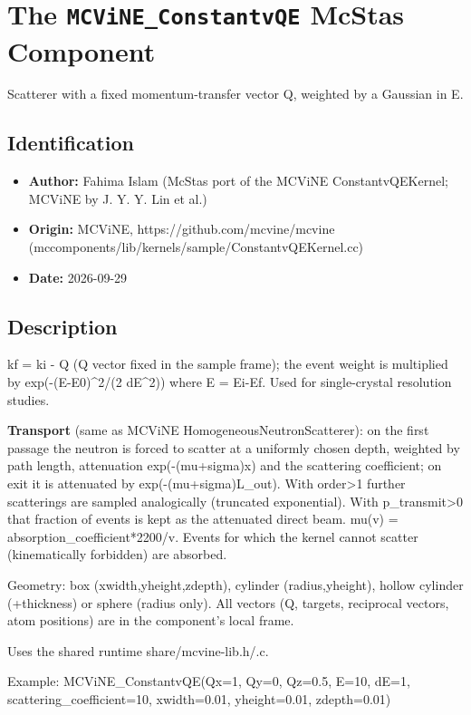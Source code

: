 \section{The \texttt{MCViNE\_ConstantvQE} McStas Component}
Scatterer with a fixed momentum-transfer vector Q, weighted by a Gaussian in E.

\subsection*{Identification}
\begin{itemize}
  \item \textbf{Author:} Fahima Islam (McStas port of the MCViNE ConstantvQEKernel; MCViNE by J. Y. Y. Lin et al.)
  \item \textbf{Origin:} MCViNE, https://github.com/mcvine/mcvine (mccomponents/lib/kernels/sample/ConstantvQEKernel.cc)
  \item \textbf{Date:} 2026-09-29
\end{itemize}

\subsection*{Description}
kf = ki - Q (Q vector fixed in the sample frame); the event weight is multiplied by exp(-(E-E0)\textasciicircum{}2/(2 dE\textasciicircum{}2)) where E = Ei-Ef. Used for single-crystal resolution studies.

\textbf{Transport} (same as MCViNE HomogeneousNeutronScatterer): on the first passage the neutron is forced to scatter at a uniformly chosen depth, weighted by path length, attenuation exp(-(mu+sigma)x) and the scattering coefficient; on exit it is attenuated by exp(-(mu+sigma)L\_out). With order\textgreater{}1 further scatterings are sampled analogically (truncated exponential). With p\_transmit\textgreater{}0 that fraction of events is kept as the attenuated direct beam. mu(v) = absorption\_coefficient*2200/v. Events for which the kernel cannot scatter (kinematically forbidden) are absorbed.

Geometry: box (xwidth,yheight,zdepth), cylinder (radius,yheight), hollow cylinder (+thickness) or sphere (radius only). All vectors (Q, targets, reciprocal vectors, atom positions) are in the component's local frame.

Uses the shared runtime share/mcvine-lib.h/.c.

Example: MCViNE\_ConstantvQE(Qx=1, Qy=0, Qz=0.5, E=10, dE=1, scattering\_coefficient=10, xwidth=0.01, yheight=0.01, zdepth=0.01)

